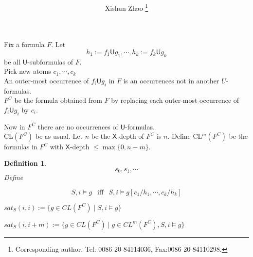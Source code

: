 \documentclass[12pt]{article}
\newtheorem{definition}{Definition}
\begin{document}




\title{
}

\author{
Xishun Zhao \footnote{Corresponding author. Tel: 0086-20-84114036,
Fax:0086-20-84110298.}
}



\maketitle

\begin{abstract}

\end{abstract}




Fix a formula $F$. Let 
$$h_1:=f_1\textsf{U}g_1,\cdots, h_k:=f_k\textsf{U}g_k$$ be all $\textsf{U}$-subformulas of $F$.\\

Pick new atoms $c_1, \cdots, c_k$\\

An outer-most occurrence of $f_i\textsf{U}g_i$ in $F$ is an occurrences not in another $U$-formulas. \\

$F^C$ be the formula obtained from $F$ by replacing each outer-most occurrence of $f_i\textsf{U}g_i$ by $c_i$. 


Now in $F^C$ there are no occurrences of $\textsf{U}$-formulas.\\ 

 
CL$(F^C)$ be as usual. Let $n$ be the $\textsf{X}$-depth of $F^C$ is $n$. Define CL$^m(F^C)$ be the formulas in $F^C$ with $\textsf{X}$-depth $\leq \max\{0, n-m\}$.  

\begin{definition}
$$s_0, s_1, \cdots$$
Define 

$$S,i\models g \ \ \mbox{ iff }\ \ S,i\models g[c_1/h_1,\cdots,c_k/h_k]$$



$sat_S(i,i):=\{g\in CL(F^C)\mid S,i\models g\}$

$sat_S(i,i+m):=\{g\in CL(F^C)\mid g\in CL^m(F^C), S,i\models g\}$

\end{definition}
\end{document}
